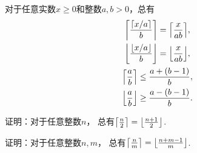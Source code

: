 \begin{property}
对于任意实数\(x \geq 0\)和整数\(a,b>0\)，总有\begin{gather}
	\ceil*{\frac{\ceil{x/a}}{b}} = \ceil*{\frac{x}{ab}}, \\
	\floor*{\frac{\floor{x/a}}{b}} = \floor*{\frac{x}{ab}}, \\
	\ceil*{\frac{a}{b}} \leq \frac{a+(b-1)}{b}, \\
	\floor*{\frac{a}{b}} \geq \frac{a-(b-1)}{b}.
\end{gather}
\end{property}

\begin{example}
证明：对于任意整数\(n\)，
总有\(\ceil*{\frac{n}2\vphantom{\frac12}} = \floor*{\frac{n+1}2}\).
\end{example}
\begin{example}
证明：对于任意整数\(n,m\)，
总有\(\ceil*{\frac{n}{m}\vphantom{\frac12}} = \floor*{\frac{n+m-1}{m}}\).
\end{example}
